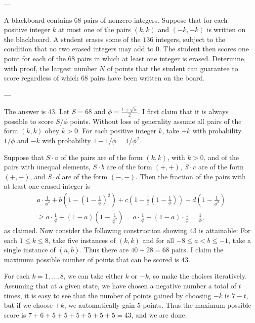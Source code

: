 
---

A blackboard contains $68$ pairs of nonzero integers. Suppose that for each positive integer $k$ at most one of the pairs $(k,k)$ and $(-k,-k)$ is written on the blackboard. A student erases some of the $136$ integers, subject to the condition that no two erased integers may add to 0. The student then scores one point for each of the $68$ pairs in which at least one integer is erased. Determine, with proof, the largest number $N$ of points that the student can guarantee to score regardless of which $68$ pairs have been written on the board.

---

The answer is $43$. Let $S=68$ and $\phi=\frac{1+\sqrt5}2$. I first claim that it is always possible to score $S/\phi$ points. Without loss of generality assume all pairs of the form $(k,k)$ obey $k>0$. For each positive integer $k$, take $+k$ with probability $1/\phi$ and $-k$ with probability $1-1/\phi=1/\phi^2$.

Suppose that $S\cdot a$ of the pairs are of the form $(k,k)$, with $k>0$, and of the pairs with unequal elements, $S\cdot b$ are of the form $(+,+)$, $S\cdot c$ are of the form $(+,-)$, and $S\cdot d$ are of the form $(-,-)$. Then the fraction of the pairs with at least one erased integer is
\begin{align*}
    &a\cdot\frac1{\phi^2}+b\left(1-\left(1-\frac1\phi\right)^2\right)+c\left(1-\frac1\phi\left(1-\frac1\phi\right)\right)+d\left(1-\frac1{\phi^2}\right)\\
    &\ge a\cdot\frac1\phi+(1-a)\left(1-\frac1{\phi^2}\right)=a\cdot\frac1\phi+(1-a)\cdot\frac1\phi=\frac1\phi,
\end{align*}
as claimed. Now consider the following construction showing $43$ is attainable: For each $1\le k\le 8$, take five instances of $(k,k)$ and for all $-8\le a<b\le-1$, take a single instance of $(a,b)$. Thus there are $40+28=68$ pairs. I claim the maximum possible number of points that can be scored is $43$.

For each $k=1,\ldots,8$, we can take either $k$ or $-k$, so make the choices iteratively. Assuming that at a given state, we have chosen a negative number a total of $t$ times, it is easy to see that the number of points gained by choosing $-k$ is $7-t$, but if we choose $+k$, we automatically gain $5$ points. Thus the maximum possible score is $7+6+5+5+5+5+5+5=43$, and we are done.

